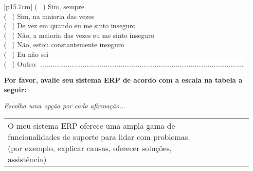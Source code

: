 \begin{longtable}{|p{15.7cm}|}
	( \ ) Sim, sempre  \\
	( \ ) Sim, na maioria das vezes  \\
	( \ ) De vez em quando eu me sinto inseguro  \\
	( \ ) Não, a maioria das vezes eu me sinto inseguro  \\
	( \ ) Não, estou constantemente inseguro \\
	( \ ) Eu não sei \\
	( \ ) Outro: \colorbox{white}{ ............................................................................................................ } \\
	\begin{Spacing}{0.8} \end{Spacing}
	\begin{Spacing}{0.8} 
		\textbf{Por favor, avalie seu sistema ERP de acordo com a escala na tabela a seguir:} \end{Spacing} 
	\begin{Spacing}{2.0} 
		\tiny \textit{Escolha uma opção por cada afirmação...} \end{Spacing} 
	\begin{Spacing}{2.0} \end{Spacing}
	\tiny \begin{tabularx}{15.7 cm}{|X|X|X|X|X|X|X|}
		\hline
		& {\rotatebox[origin=c]{90}{\parbox[c]{2.5cm}{\centering \textcolor{white}{.}\newline \medskip Concordo Completamente}}} 
		& {\rotatebox[origin=c]{90}{\parbox[c]{2.5cm}{\centering \textcolor{white}{.}\newline \medskip Concordo Parcialmente}}} 
		& {\rotatebox[origin=c]{90}{\parbox[c]{2.5cm}{\centering \textcolor{white}{.}\newline \medskip Não Concordo \newline Nem Discordo}}}	 
		& {\rotatebox[origin=c]{90}{\parbox[c]{2.5cm}{\centering \textcolor{white}{.}\newline \medskip Discordo  Parcialmente }}} 
		& {\rotatebox[origin=c]{90}{\parbox[c]{2.5cm}{\centering \textcolor{white}{.}\newline \medskip Discordo  Completamente  }}}
		& {\rotatebox[origin=c]{90}{\parbox[c]{2.5cm}{\centering \textcolor{white}{.}\newline  \textcolor{white}{.}\newline Eu Não Sei }}} \\
		\hline
		O meu sistema ERP oferece uma ampla gama de funcionalidades de suporte para lidar com problemas. (por exemplo, explicar causas, oferecer soluções, assistência) &   &   &   &   &   &  \\

\end{tabularx}
\end{longtable}
